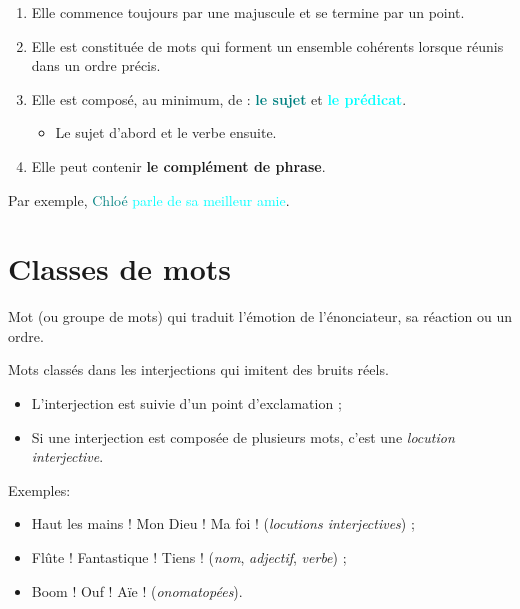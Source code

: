 \documentclass[10pt, french]{article}
\begin{document}
\begin{multicols*}{2}
\begin{definitionNOHFILLpropos}[Caractéristiques]
\begin{enumerate}
	\item	Elle commence toujours par une majuscule et se termine par un point.
	\item	Elle est constituée de mots qui forment un ensemble cohérents lorsque réunis dans un ordre précis.
	\item	Elle est composé, au minimum, de : \textbf{\textcolor{teal}{le sujet}} et \textbf{\textcolor{cyan}{le prédicat}}.
		\begin{itemize}
		\item	Le sujet d'abord et le verbe ensuite.
		\end{itemize}
	\item	Elle peut contenir \textbf{le complément de phrase}.
\end{enumerate}
\tcbline
Par exemple, \textcolor{teal}{Chloé} \textcolor{cyan}{parle de sa meilleur amie}.
\end{definitionNOHFILLpropos}




\newpage
\section{Classes de mots}

\begin{definitionNOHFILL}[Interjection]
Mot (ou groupe de mots) qui traduit l'émotion de l'énonciateur, sa réaction ou un ordre.
\begin{definitionNOHFILL}[Onomatopées]
Mots classés dans les interjections qui imitent des bruits réels.
\end{definitionNOHFILL}
\begin{itemize}
	\item	L'interjection est suivie d'un point d'exclamation ;
	\item	Si une interjection est composée de plusieurs mots, c'est une \textit{locution interjective}.
\end{itemize}
\tcbline

Exemples:
\begin{itemize}
	\item	Haut les mains ! Mon Dieu ! Ma foi ! (\textit{locutions interjectives}) ;
	\item	Flûte ! Fantastique ! Tiens ! (\textit{nom}, \textit{adjectif}, \textit{verbe}) ;
	\item	Boom ! Ouf ! Aïe ! (\textit{onomatopées}).
\end{itemize}
\end{definitionNOHFILL}


\end{multicols*}
\end{document}
